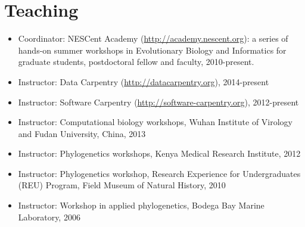 \documentclass[10pt]{article}
\begin{document}
\section*{Teaching}
\begin{itemize}
\item{Coordinator: NESCent Academy (\url{http://academy.nescent.org}): a series of hands-on summer workshops in Evolutionary Biology and Informatics for graduate students, postdoctoral fellow and faculty, 2010-present.}
\item{Instructor: Data Carpentry (\url{http://datacarpentry.org}), 2014-present}
\item{Instructor: Software Carpentry (\url{http://software-carpentry.org}), 2012-present}
\item{Instructor: Computational biology workshops, Wuhan Institute of Virology and Fudan University, China, 2013}
\item{Instructor: Phylogenetics workshops, Kenya Medical Research Institute, 2012}
\item{Instructor: Phylogenetics workshop, Research Experience for Undergraduates (REU) Program, Field Museum of Natural History, 2010}
\item{Instructor: Workshop in applied phylogenetics, Bodega Bay Marine Laboratory, 2006}
\end{itemize}
\end{document}
